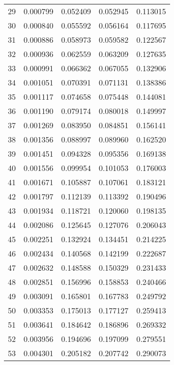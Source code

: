 \begin{center}
\begin{tabular}{|c|c|c|c|c|}
    29    & 0.000799   & 0.052409     & 0.052945     & 0.113015 \\ 
    30    & 0.000840   & 0.055592     & 0.056164     & 0.117695 \\ 
    31    & 0.000886   & 0.058973     & 0.059582     & 0.122567 \\ 
    32    & 0.000936   & 0.062559     & 0.063209     & 0.127635 \\ 
    33    & 0.000991   & 0.066362     & 0.067055     & 0.132906 \\ 
    34    & 0.001051   & 0.070391     & 0.071131     & 0.138386 \\ 
    35    & 0.001117   & 0.074658     & 0.075448     & 0.144081 \\ 
    36    & 0.001190   & 0.079174     & 0.080018     & 0.149997 \\ 
    37    & 0.001269   & 0.083950     & 0.084851     & 0.156141 \\ 
    38    & 0.001356   & 0.088997     & 0.089960     & 0.162520 \\ 
    39    & 0.001451   & 0.094328     & 0.095356     & 0.169138 \\ 
    40    & 0.001556   & 0.099954     & 0.101053     & 0.176003 \\ 
    41    & 0.001671   & 0.105887     & 0.107061     & 0.183121 \\ 
    42    & 0.001797   & 0.112139     & 0.113392     & 0.190496 \\ 
    43    & 0.001934   & 0.118721     & 0.120060     & 0.198135 \\ 
    44    & 0.002086   & 0.125645     & 0.127076     & 0.206043 \\ 
    45    & 0.002251   & 0.132924     & 0.134451     & 0.214225 \\ 
    46    & 0.002434   & 0.140568     & 0.142199     & 0.222687 \\ 
    47    & 0.002632   & 0.148588     & 0.150329     & 0.231433 \\ 
    48    & 0.002851   & 0.156996     & 0.158853     & 0.240466 \\ 
    49    & 0.003091   & 0.165801     & 0.167783     & 0.249792 \\ 
    50    & 0.003353   & 0.175013     & 0.177127     & 0.259413 \\ 
    51    & 0.003641   & 0.184642     & 0.186896     & 0.269332 \\ 
    52    & 0.003956   & 0.194696     & 0.197099     & 0.279551 \\ 
    53    & 0.004301   & 0.205182     & 0.207742     & 0.290073 \\ 

\end{tabular}
\end{center}
